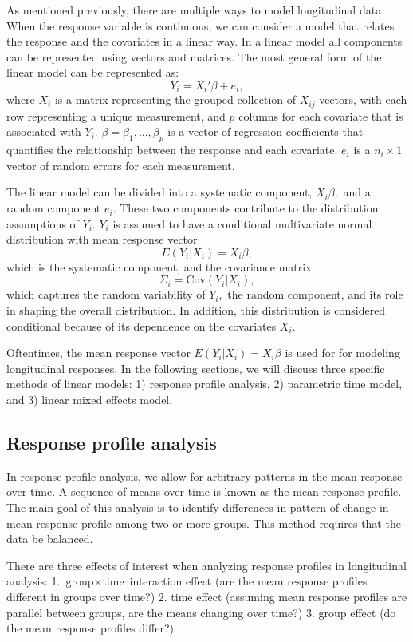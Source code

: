 \documentclass[12pt, twoside]{amherstthesis}
\begin{document}
As mentioned previously, there are multiple ways to model longitudinal data. When the response variable is continuous, we can consider a model that relates the response and the covariates in a linear way. In a linear model all components can be represented using vectors and matrices. The most general form of the linear model can be represented as:
\[Y_i=X_i'\beta + e_i,\] where \(X_i\) is a matrix representing the grouped collection of \(X_{ij}\) vectors, with each row representing a unique measurement, and \(p\) columns for each covariate that is associated with \(Y_i.\) \(\beta = \beta_1,...,\beta_p\) is a vector of regression coefficients that quantifies the relationship between the response and each covariate. \(e_i\) is a \(n_i \times 1\) vector of random errors for each measurement.

The linear model can be divided into a systematic component, \(X_i\beta,\) and a random component \(e_i.\) These two components contribute to the distribution assumptions of \(Y_i.\) \(Y_i\) is assumed to have a conditional multivariate normal distribution with mean response vector \[E(Y_i|X_i) = X_i\beta,\] which is the systematic component, and the covariance matrix \[\Sigma_i = \text{Cov}(Y_i|X_i),\] which captures the random variability of \(Y_i,\) the random component, and its role in shaping the overall distribution. In addition, this distribution is considered conditional because of its dependence on the covariates \(X_i.\)

Oftentimes, the mean response vector \(E(Y_i|X_i) = X_i\beta\) is used for for modeling longitudinal responses. In the following sections, we will discuss three specific methods of linear models: 1) response profile analysis, 2) parametric time model, and 3) linear mixed effects model.

\hypertarget{response-profile-analysis}{%
\subsection{Response profile analysis}\label{response-profile-analysis}}

In response profile analysis, we allow for arbitrary patterns in the mean response over time. A sequence of means over time is known as the mean response profile. The main goal of this analysis is to identify differences in pattern of change in mean response profile among two or more groups. This method requires that the data be balanced.

There are three effects of interest when analyzing response profiles in longitudinal analysis:
1. \(\text{group} \times \text{time}\) interaction effect (are the mean response profiles different in groups over time?)
2. time effect (assuming mean response profiles are parallel between groups, are the means changing over time?)
3. group effect (do the mean response profiles differ?)
\end{document}

